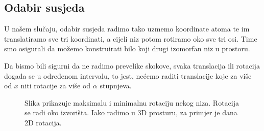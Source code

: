 \documentclass[times, utf8, zavrsni]{fer}
\begin{document}
\subsection{Odabir susjeda}
U našem slučaju, odabir susjeda radimo tako uzmemo koordinate atoma te
im translatiramo sve tri koordinati, a cijeli niz potom rotiramo oko sve tri
osi. Time smo osigurali da možemo konstruirati bilo koji drugi izomorfan niz u
prostoru.

Da bismo bili sigurni da ne radimo prevelike skokove, svaka translacija
ili rotacija događa se u određenom intervalu, to jest,
nećemo raditi translacije koje za više od $x$ niti rotacije za više od
$\alpha$ stupnjeva.

\begin{figure}
\centering
{}
\caption[Rotacija nizova]{Slika prikazuje
maksimalu i minimalnu rotaciju nekog niza. Rotacija se radi oko
izvorišta. Iako radimo u 3D prosturu, za primjer je dana 2D
rotacija.}
\label{figure:susjed:rotacija}
\end{figure}
\end{document}
